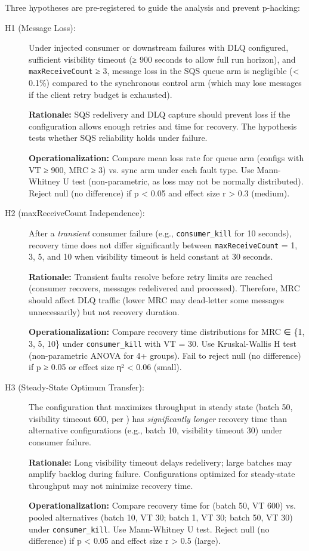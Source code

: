 Three hypotheses are pre-registered to guide the analysis and prevent p-hacking:

\begin{description}
    \item[H1 (Message Loss):] Under injected consumer or downstream failures with DLQ configured, sufficient visibility timeout (≥ 900 seconds to allow full run horizon), and \texttt{maxReceiveCount} ≥ 3, message loss in the SQS queue arm is negligible (< 0.1\%) compared to the synchronous control arm (which may lose messages if the client retry budget is exhausted).
    
    \textbf{Rationale:} SQS redelivery and DLQ capture should prevent loss if the configuration allows enough retries and time for recovery. The hypothesis tests whether SQS reliability holds under failure.
    
    \textbf{Operationalization:} Compare mean loss rate for queue arm (configs with VT ≥ 900, MRC ≥ 3) vs. sync arm under each fault type. Use Mann-Whitney U test (non-parametric, as loss may not be normally distributed). Reject null (no difference) if p < 0.05 and effect size r > 0.3 (medium).
    
    \item[H2 (maxReceiveCount Independence):] After a \emph{transient} consumer failure (e.g., \texttt{consumer\_kill} for 10 seconds), recovery time does not differ significantly between \texttt{maxReceiveCount} = 1, 3, 5, and 10 when visibility timeout is held constant at 30 seconds.
    
    \textbf{Rationale:} Transient faults resolve before retry limits are reached (consumer recovers, messages redelivered and processed). Therefore, MRC should affect DLQ traffic (lower MRC may dead-letter some messages unnecessarily) but not recovery duration.
    
    \textbf{Operationalization:} Compare recovery time distributions for MRC ∈ \{1, 3, 5, 10\} under \texttt{consumer\_kill} with VT = 30. Use Kruskal-Wallis H test (non-parametric ANOVA for 4+ groups). Fail to reject null (no difference) if p ≥ 0.05 or effect size η² < 0.06 (small).
    
    \item[H3 (Steady-State Optimum Transfer):] The configuration that maximizes throughput in steady state (batch 50, visibility timeout 600, per \citet{Kyrychenko2025}) has \emph{significantly longer} recovery time than alternative configurations (e.g., batch 10, visibility timeout 30) under consumer failure.
    
    \textbf{Rationale:} Long visibility timeout delays redelivery; large batches may amplify backlog during failure. Configurations optimized for steady-state throughput may not minimize recovery time.
    
    \textbf{Operationalization:} Compare recovery time for (batch 50, VT 600) vs. pooled alternatives (batch 10, VT 30; batch 1, VT 30; batch 50, VT 30) under \texttt{consumer\_kill}. Use Mann-Whitney U test. Reject null (no difference) if p < 0.05 and effect size r > 0.5 (large).
\end{description}

